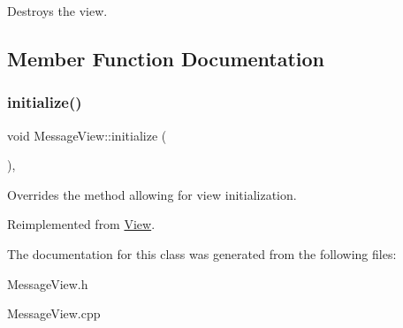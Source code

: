 Destroys the view. 



\subsection{Member Function Documentation}
\mbox{\label{class_message_view_a869de4a6b084eb205184de7f524160e2}} 
\subsubsection{\texorpdfstring{initialize()}{initialize()}}
{\footnotesize\ttfamily void Message\+View\+::initialize (\begin{DoxyParamCaption}{ }\end{DoxyParamCaption})\hspace{0.3cm}{\ttfamily [override]}, {\ttfamily [virtual]}}



Overrides the method allowing for view initialization. 



Reimplemented from \mbox{\hyperlink{class_view_a334fa9a19d2faca0120ef2869c3dd8ad}{View}}.



The documentation for this class was generated from the following files\+:\begin{DoxyCompactItemize}
\item 
Message\+View.\+h\item 
Message\+View.\+cpp\end{DoxyCompactItemize}
